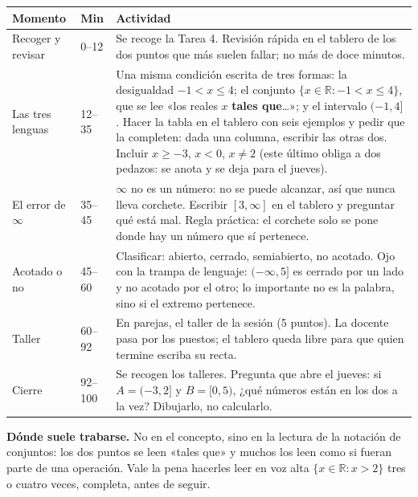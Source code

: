 \documentclass[11pt]{article}
\begin{document}
\begin{center}
{\renewcommand{\arraystretch}{1.3}
\begin{tabularx}{\linewidth}{@{}l l X@{}}
  \toprule
  \textbf{Momento} & \textbf{Min} & \textbf{Actividad}\\
  \midrule
  Recoger y revisar & 0--12 & Se recoge la Tarea 4. Revisión rápida en el tablero de los dos
    puntos que más suelen fallar; no más de doce minutos.\\
  Las tres lenguas & 12--35 & Una misma condición escrita de tres formas: la desigualdad
    $-1 < x \le 4$; el conjunto $\{x \in \mathbb{R} : -1 < x \le 4\}$, que se lee «los reales
    $x$ \textbf{tales que}…»; y el intervalo $(-1, 4]$. Hacer la tabla en el tablero con seis
    ejemplos y pedir que la completen: dada una columna, escribir las otras dos. Incluir
    $x \ge -3$, $x < 0$, $x \ne 2$ (este último obliga a dos pedazos: se anota y se deja para
    el jueves).\\
  El error de $\infty$ & 35--45 & $\infty$ no es un número: no se puede alcanzar, así que
    nunca lleva corchete. Escribir $[3, \infty]$ en el tablero y preguntar qué está mal. Regla
    práctica: el corchete solo se pone donde hay un número que sí pertenece.\\
  Acotado o no & 45--60 & Clasificar: abierto, cerrado, semiabierto, no acotado. Ojo con la
    trampa de lenguaje: $(-\infty, 5]$ es cerrado por un lado y no acotado por el otro; lo
    importante no es la palabra, sino si el extremo pertenece.\\
  Taller & 60--92 & En parejas, el taller de la sesión (5 puntos). La docente pasa por los
    puestos; el tablero queda libre para que quien termine escriba su recta.\\
  Cierre & 92--100 & Se recogen los talleres. Pregunta que abre el jueves: si $A = (-3, 2]$ y
    $B = [0, 5)$, ¿qué números están en los dos a la vez? Dibujarlo, no calcularlo.\\
  \bottomrule
\end{tabularx}}
\end{center}

\begin{nota}
\textbf{Dónde suele trabarse.} No en el concepto, sino en la lectura de la notación de
conjuntos: los dos puntos se leen «tales que» y muchos los leen como si fueran parte de una
operación. Vale la pena hacerles leer en voz alta $\{x \in \mathbb{R} : x > 2\}$ tres o cuatro
veces, completa, antes de seguir.
\end{nota}
\end{document}
